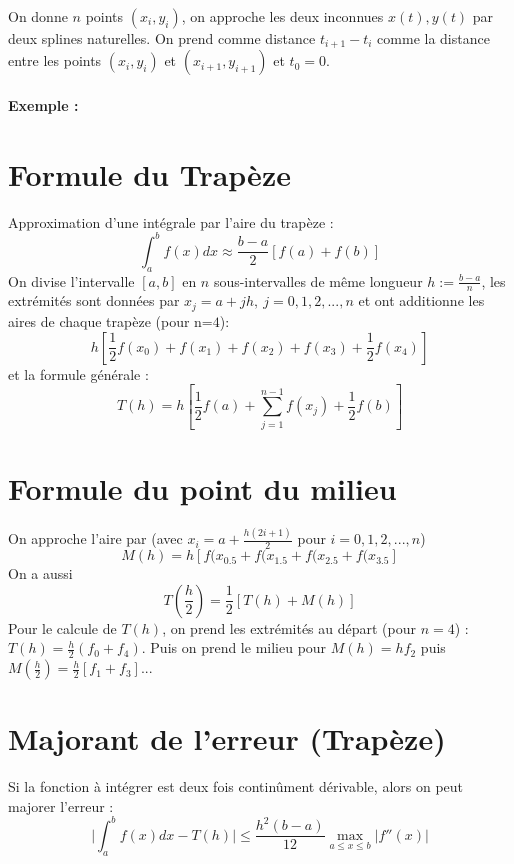 \documentclass[a4paper,9pt]{extarticle}
\begin{document}
\begin{multicols*}{2}
On donne $n$ points $(x_i,y_i)$, on approche les deux inconnues $x(t),y(t)$ par deux splines naturelles. On prend comme distance $t_{i+1}-t_i$ comme la distance entre les points $(x_i,y_i)$ et $(x_{i+1},y_{i+1})$ et $t_0=0$.

\paragraph*{Exemple :}



\section{Formule du Trapèze}
Approximation d'une intégrale par l'aire du trapèze :
$$
\int_a^bf(x)dx\approx\frac{b-a}{2}[f(a)+f(b)]
$$
On divise l'intervalle $[a,b]$ en $n$ sous-intervalles de même longueur $h := \frac{b-a}{n}$, les extrémités sont données par $x_j=a+jh,\ j=0,1,2,...,n$ et ont additionne les aires de chaque trapèze (pour n=$4$):
$$
h[\frac{1}{2}f(x_0)+f(x_1)+f(x_2)+f(x_3)+\frac{1}{2}f(x_4)]
$$
et la formule générale :
$$
T(h)=h[\frac{1}{2}f(a)+\sum_{j=1}^{n-1}f(x_j)+\frac{1}{2}f(b)]
$$

\section{Formule du point du milieu}

On approche l'aire par (avec $x_i=a+\frac{h(2i+1)}{2}$ pour $i=0,1,2,...,n$)
$$
M(h)=h[f(x_{0.5}+f(x_{1.5}+f(x_{2.5}+f(x_{3.5}]
$$
On a aussi
$$
T(\frac{h}{2})=\frac{1}{2}[T(h)+M(h)]
$$
Pour le calcule de $T(h)$, on prend les extrémités au départ (pour $n=4$) : $T(h)=\frac{h}{2}(f_0+f_4)$. Puis on prend le milieu pour $M(h)=hf_2$ puis $M(\frac{h}{2})=\frac{h}{2}[f_1+f_3]$...

\section{Majorant de l'erreur (Trapèze)}
Si la fonction à intégrer est deux fois continûment dérivable, alors on peut majorer l'erreur :
$$
\Big|\int_a^bf(x)dx-T(h)\Big|\leq \frac{h^2(b-a)}{12} \max_{a\leq x \leq b}|f''(x)|
$$


\end{multicols*}
\end{document}
